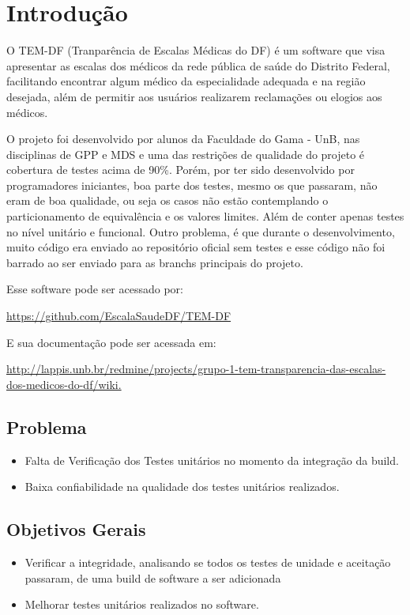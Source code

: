 \chapter[Introdução]{Introdução}

O TEM-DF (Tranparência de Escalas Médicas do DF) é um software que visa apresentar as escalas dos médicos da rede pública de saúde do Distrito Federal, facilitando encontrar algum médico da especialidade adequada e na região desejada, além de permitir aos usuários realizarem reclamações ou elogios aos médicos. 


O projeto foi desenvolvido por alunos da Faculdade do Gama - UnB, nas disciplinas de GPP e MDS e uma das restrições de qualidade do projeto é cobertura de testes acima de 90\%. Porém, por ter sido desenvolvido por programadores iniciantes, boa parte dos testes, mesmo os que passaram, não eram de boa qualidade, ou seja os casos não estão contemplando o particionamento de equivalência e os valores limites. Além de conter apenas testes no nível unitário e funcional. Outro problema, é que durante o desenvolvimento, muito código era enviado ao repositório oficial sem testes e esse código não foi barrado ao ser enviado para as branchs principais do projeto.


Esse software pode ser acessado por:

\url{https://github.com/EscalaSaudeDF/TEM-DF} 

E sua documentação pode ser acessada em:

\url{http://lappis.unb.br/redmine/projects/grupo-1-tem-transparencia-das-escalas-dos-medicos-do-df/wiki.}


\section{Problema}
\begin{itemize}
\item Falta de Verificação dos Testes unitários no momento da integração da build.
\item Baixa confiabilidade na qualidade dos testes unitários realizados.
\end{itemize}

\section{Objetivos Gerais }
\begin{itemize}
    \item Verificar a integridade, analisando se todos os testes de unidade e aceitação passaram, de uma build de software a ser adicionada
    \item Melhorar testes unitários realizados no software.
\end{itemize}

